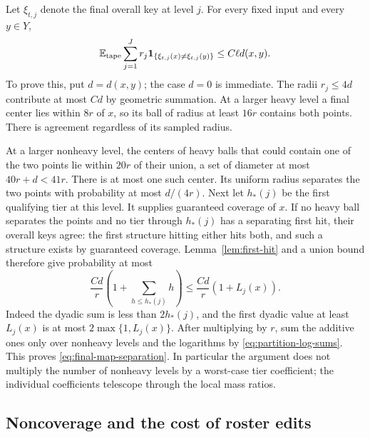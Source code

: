 Let \(\xi_{t,j}\) denote the final overall key at level \(j\).
For every fixed input and every \(y\in Y\),
\begin{equation}\label{eq:final-map-separation}
 \mathbb E_{\rm tape}\sum_{j=1}^Jr_j
 \mathbf 1_{\{\xi_{t,j}(x)\ne\xi_{t,j}(y)\}}
 \le C\ell d(x,y).
\end{equation}
To prove this, put \(d=d(x,y)\); the case \(d=0\) is immediate.
The radii \(r_j\le4d\) contribute at most \(C d\) by geometric
summation.  At a larger heavy level a final center lies within \(8r\)
of \(x\), so its ball of radius at least \(16r\) contains both points.
There is agreement regardless of its sampled radius.

At a larger nonheavy level, the centers of heavy balls that could contain
one of the two points lie within \(20r\) of their union, a set of
diameter at most \(40r+d<41r\).  There is at most one such center.
Its uniform radius separates the two points with probability at most
\(d/(4r)\).  Next let \(h_*(j)\) be the first qualifying tier at this
level.  It supplies guaranteed coverage of \(x\).  If no heavy ball
separates the points and no tier through \(h_*(j)\) has a separating
first hit, their overall keys agree: the first structure hitting either
hits both, and such a structure exists by guaranteed coverage.
Lemma~\ref{lem:first-hit} and a union bound therefore give probability
at most
\[
 \frac{Cd}{r}\left(1+\sum_{h\le h_*(j)}h\right)
 \le\frac{Cd}{r}(1+L_j(x)).
\]
Indeed the dyadic sum is less than \(2h_*(j)\), and the first dyadic
value at least \(L_j(x)\) is at most \(2\max\{1,L_j(x)\}\).
After multiplying by \(r\), sum the additive ones only over nonheavy
levels and the logarithms by \eqref{eq:partition-log-sums}.  This proves
\eqref{eq:final-map-separation}.  In particular the argument does not
multiply the number of nonheavy levels by a worst-case tier coefficient;
the individual coefficients telescope through the local mass ratios.

\subsection{Noncoverage and the cost of roster edits}

